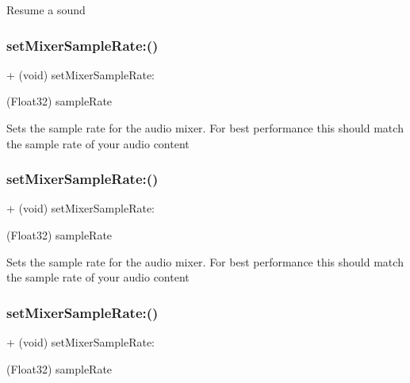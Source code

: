 Resume a sound \mbox{\label{interfaceCDSoundEngine_ab917455684b0ff4ea92e3d2a82d3530c}} 
\subsubsection{\texorpdfstring{set\+Mixer\+Sample\+Rate\+:()}{setMixerSampleRate:()}\hspace{0.1cm}{\footnotesize\ttfamily [1/4]}}
{\footnotesize\ttfamily + (void) set\+Mixer\+Sample\+Rate\+: \begin{DoxyParamCaption}\item[{(Float32)}]{sample\+Rate }\end{DoxyParamCaption}}

Sets the sample rate for the audio mixer. For best performance this should match the sample rate of your audio content \mbox{\label{interfaceCDSoundEngine_ab917455684b0ff4ea92e3d2a82d3530c}} 
\subsubsection{\texorpdfstring{set\+Mixer\+Sample\+Rate\+:()}{setMixerSampleRate:()}\hspace{0.1cm}{\footnotesize\ttfamily [2/4]}}
{\footnotesize\ttfamily + (void) set\+Mixer\+Sample\+Rate\+: \begin{DoxyParamCaption}\item[{(Float32)}]{sample\+Rate }\end{DoxyParamCaption}}

Sets the sample rate for the audio mixer. For best performance this should match the sample rate of your audio content \mbox{\label{interfaceCDSoundEngine_ab917455684b0ff4ea92e3d2a82d3530c}} 
\subsubsection{\texorpdfstring{set\+Mixer\+Sample\+Rate\+:()}{setMixerSampleRate:()}\hspace{0.1cm}{\footnotesize\ttfamily [3/4]}}
{\footnotesize\ttfamily + (void) set\+Mixer\+Sample\+Rate\+: \begin{DoxyParamCaption}\item[{(Float32)}]{sample\+Rate }\end{DoxyParamCaption}}


